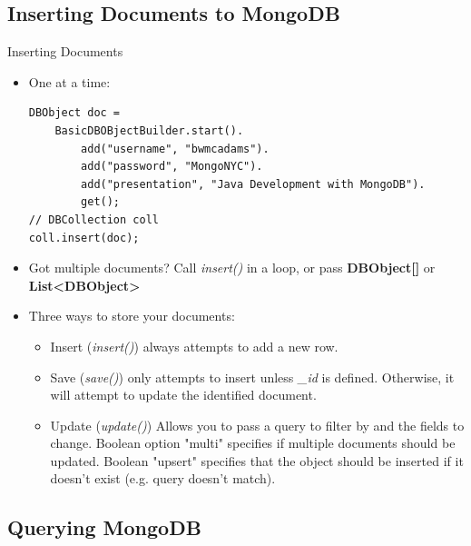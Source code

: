 \documentclass{beamer}
\begin{document}
\subsection[Inserting Documents to MongoDB]{Inserting Documents to MongoDB}

\begin{frame}[fragile]{Inserting Documents}
    \begin{itemize}
        \item<2-> One at a time:\\
\begin{lstlisting}
DBObject doc = 
    BasicDBOBjectBuilder.start().
        add("username", "bwmcadams").
        add("password", "MongoNYC").
        add("presentation", "Java Development with MongoDB").
        get();
// DBCollection coll
coll.insert(doc);
\end{lstlisting}
        \item<3-> Got multiple documents? Call {\em insert()} in a loop, or pass {\bf DBObject[]} or {\bf List<DBObject>}
        \item<4-> Three ways to store your documents:
        \begin{itemize}
            \item {\sc Insert} ({\em insert()}) always attempts to add a new row.
            \item {\sc Save} ({\em save()}) only attempts to insert unless {\em \_id} is defined.  Otherwise, it will attempt to update the identified document.
            \item {\sc Update} ({\em update()}) Allows you to pass a query to filter by and the fields to change.  Boolean option "multi" specifies if multiple documents should be updated.  Boolean "upsert" specifies that the object should be inserted if it doesn't exist (e.g. query doesn't match).
        \end{itemize}
    \end{itemize}
\end{frame}

\subsection[Querying MongoDB]{Querying MongoDB}
\end{document}
